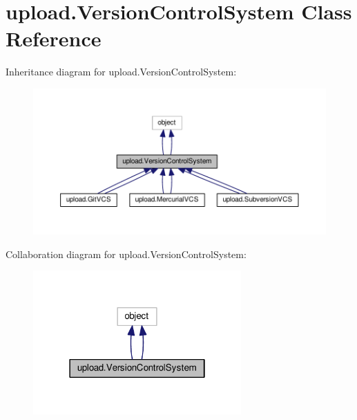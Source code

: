 \hypertarget{classupload_1_1VersionControlSystem}{}\section{upload.\+Version\+Control\+System Class Reference}
\label{classupload_1_1VersionControlSystem}


Inheritance diagram for upload.\+Version\+Control\+System\+:\nopagebreak
\begin{figure}[H]
\begin{center}
\leavevmode
\includegraphics[width=350pt]{classupload_1_1VersionControlSystem__inherit__graph}
\end{center}
\end{figure}


Collaboration diagram for upload.\+Version\+Control\+System\+:\nopagebreak
\begin{figure}[H]
\begin{center}
\leavevmode
\includegraphics[width=226pt]{classupload_1_1VersionControlSystem__coll__graph}
\end{center}
\end{figure}
